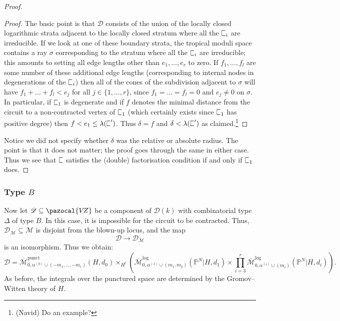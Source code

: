 \documentclass[11pt]{amsart}
\newcommand{\sqC}{\scalebox{0.8}[1.3]{$\sqsubset$}}
\newcommand{\Mlog}[4]{\overline{\mathcal{M}}^{\operatorname{log}}_{#1,#2}(#3,#4)}
\newcommand{\Mpunct}[4]{\overline{\mathcal{M}}^{\operatorname{punct}}_{#1,#2}(#3,#4)}
\newcommand{\PP}{\mathbb P}
\newcommand{\VZ}{\pazocal{V\!Z}}
\renewcommand{\to}{\rightarrow}
\newcommand{\Mcal}{\mathcal{M}}
\newcommand{\Dcal}{\mathcal{D}}
\theoremstyle{definition}
\theoremstyle{definition}
\begin{document}
\begin{proof}
\begin{proof} The basic point is that $\Dcal$ consists of the union of the locally closed logarithmic strata adjacent to the locally closed stratum where all the $\sqC_i$ are irreducible. If we look at one of these boundary strata, the tropical moduli space contains a ray $\sigma$ corresponding to the stratum where all the $\sqC_i$ are irreducible; this amounts to setting all edge lengths other than $e_1,\ldots,e_r$ to zero. If $f_1,\ldots,f_l$ are some number of these additional edge lengths (corresponding to internal nodes in degenerations of the $\sqC_i$) then all of the cones of the subdivision adjacent to $\sigma$ will have $f_1+\ldots+f_l < e_j$ for all $j\in\{1,\ldots,r\}$, since $f_1=\ldots=f_l=0$ and $e_j \neq 0$ on $\sigma$. In particular, if $\sqC_1$ is degenerate and if $f$ denotes the minimal distance from the circuit to a non-contracted vertex of $\sqC_1$ (which certainly exists since $\sqC_1$ has positive degree) then $f < e_1 \leq \lambda(\sqC^\prime)$. Thus $\delta=f$ and $\delta < \lambda(\sqC^\prime)$ as claimed.\footnote{(Navid) Do an example?}\end{proof}
\noindent Notice we did not specify whether $\delta$ was the relative or absolute radius. The point is that it does not matter; the proof goes through the same in either case. Thus we see that $\sqC$ satisfies the (double) factorisation condition if and only if $\sqC_1$ does.\end{proof}

\subsubsection{Type $B$}
Now let $\Dcal\subseteq\VZ$ be a component of $\Dcal(k)$ with combinatorial type $\Delta$ of type $B$. In this case, it is impossible for the circuit to be contracted. Thus, $\Dcal_\Mcal \subseteq \Mcal$ is disjoint from the blown-up locus, and the map
\begin{equation*} \Dcal \to \Dcal_\Mcal \end{equation*}
is an isomorphism. Thus we obtain:
\begin{equation*} \Dcal = \Mpunct{0}{\alpha^{(0)}\cup(-m_1,\ldots,-m_r)}{H}{d_0}\times_{H^r}\left(\Mlog{0}{\alpha^{(1)}\cup(m_1,m_2)}{\PP^N|H}{d_1}\times\prod_{i=3}^r\Mlog{0}{\alpha^{(i)}\cup(m_i)}{\PP^N|H}{d_i}\right).\end{equation*}
As before, the integrals over the punctured space are determined by the Gromov--Witten theory of $H$.
\end{document}
